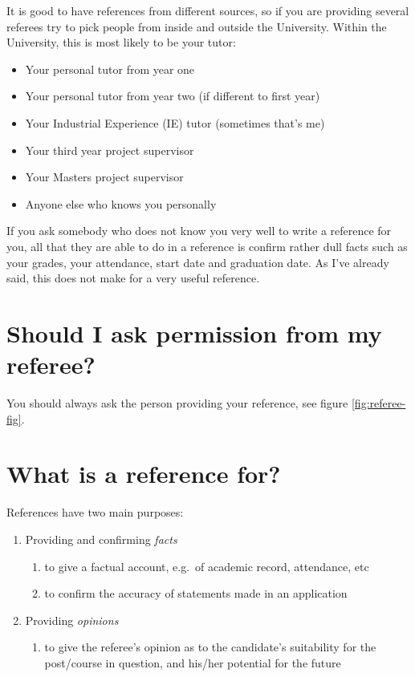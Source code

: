 \documentclass[
  12pt,
]{book}
\providecommand{\tightlist}{%
  \setlength{\itemsep}{0pt}\setlength{\parskip}{0pt}}
\begin{document}
It is good to have references from different sources, so if you are providing several referees try to pick people from inside and outside the University. Within the University, this is most likely to be your tutor:

\begin{itemize}
\tightlist
\item
  Your personal tutor from year one
\item
  Your personal tutor from year two (if different to first year)
\item
  Your Industrial Experience (IE) tutor (sometimes that's me)
\item
  Your third year project supervisor
\item
  Your Masters project supervisor
\item
  Anyone else who knows you personally
\end{itemize}

If you ask somebody who does not know you very well to write a reference for you, all that they are able to do in a reference is confirm rather dull facts such as your grades, your attendance, start date and graduation date. As I've already said, this does not make for a very useful reference.

\hypertarget{should-i-ask-permission-from-my-referee}{%
\section{Should I ask permission from my referee?}\label{should-i-ask-permission-from-my-referee}}

You should always ask the person providing your reference, see figure \ref{fig:referee-fig}.

\hypertarget{what-is-a-reference-for}{%
\section{What is a reference for?}\label{what-is-a-reference-for}}

References have two main purposes:

\begin{enumerate}
\def\labelenumi{\arabic{enumi}.}
\tightlist
\item
  Providing and confirming \emph{facts}

  \begin{enumerate}
  \def\labelenumii{\roman{enumii}.}
  \tightlist
  \item
    to give a factual account, e.g.~of academic record, attendance, etc
  \item
    to confirm the accuracy of statements made in an application
  \end{enumerate}
\item
  Providing \emph{opinions}

  \begin{enumerate}
  \def\labelenumii{\roman{enumii}.}
  \tightlist
  \item
    to give the referee's opinion as to the candidate's suitability for the post/course in
    question, and his/her potential for the future
  \end{enumerate}
\end{enumerate}
\end{document}
